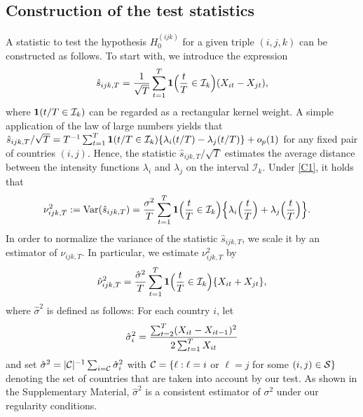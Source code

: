 \documentclass[a4paper,12pt]{article}
\numberwithin{equation}{section}
\begin{document}
\subsection{Construction of the test statistics}\label{subsec:test:test}


A statistic to test the hypothesis $H_0^{(ijk)}$ for a given triple $(i,j,k)$ can be constructed as follows. To start with, we introduce the expression 
\[ \hat{s}_{ijk,T} = \frac{1}{\sqrt{T}} \sum\limits_{t=1}^T \boldsymbol{1}\Big(\frac{t}{T} \in \mathcal{I}_k\Big) (X_{it} - X_{jt}), \]
where $\boldsymbol{1}(t/T \in \mathcal{I}_k)$ can be regarded as a rectangular kernel weight. A simple application of the law of large numbers yields that $\hat{s}_{ijk,T}/\sqrt{T} = T^{-1} \sum_{t=1}^T \boldsymbol{1}(t/T \in \mathcal{I}_k) \{\lambda_i(t/T) - \lambda_j(t/T)\} + o_p(1)$ for any fixed pair of countries $(i,j)$. Hence, the statistic $\hat{s}_{ijk,T}/\sqrt{T}$ estimates the average distance between the intensity functions $\lambda_i$ and $\lambda_j$ on the interval $\mathcal{I}_k$. Under \ref{C1}, it holds that
\begin{align*}
\nu_{ijk,T}^2 := \textnormal{Var}(\hat{s}_{ijk,T}) 
 & = \frac{\sigma^2}{T} \sum\limits_{t=1}^T \boldsymbol{1}\Big(\frac{t}{T} \in \mathcal{I}_k\Big) \Big\{ \lambda_i\Big(\frac{t}{T}\Big) + \lambda_j\Big(\frac{t}{T}\Big) \Big\}. 
\end{align*}
In order to normalize the variance of the statistic $\hat{s}_{ijk,T}$, we scale it by an estimator of $\nu_{ijk,T}$. In particular, we estimate $\nu_{ijk,T}^2$ by 
\[ \hat{\nu}_{ijk,T}^2 = \frac{\hat{\sigma}^2}{T} \sum\limits_{t=1}^T \boldsymbol{1}\Big(\frac{t}{T} \in \mathcal{I}_k\Big) \{ X_{it} + X_{jt} \}, \]
where $\hat{\sigma}^2$ is defined as follows: For each country $i$, let 
\begin{align*}
\hat{\sigma}_i^2 = \frac{\sum_{t=2}^T (X_{it}-X_{it-1})^2}{2 \sum_{t=1}^T X_{it}}
\end{align*}
and set $\hat{\sigma}^2 = |\mathcal{C}|^{-1} \sum_{i=\mathcal{C}} \hat{\sigma}_i^2$ with $\mathcal{C} = \{ \ell: \ell = i$ or $\ell = j$ for some $(i,j) \in \mathcal{S} \}$ denoting the set of countries that are taken into account by our test. As shown in the Supplementary Material, $\hat{\sigma}^2$ is a consistent estimator of $\sigma^2$ under our regularity conditions. 
\end{document}
